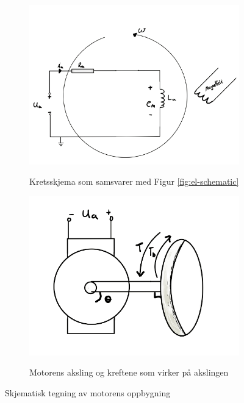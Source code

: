 \begin{figure}[h]
	\centering
	\begin{subfigure}[a]{0.450\textwidth}
		\centering
		\includegraphics[width = \textwidth]{Images/a_Circuit.png}
		\caption{}{Kretsskjema som samsvarer med Figur \ref{fig:el-schematic}}
		
	\end{subfigure}
	\begin{subfigure}[a]{0.450\textwidth}
		\centering
		\includegraphics[width = \textwidth]{Images/a_Motor.png}
		\caption{}{Motorens aksling og kreftene som virker på akslingen}
		\label{fig:el-drawing-hand}
	\end{subfigure}
	\caption{Skjematisk tegning av motorens oppbygning}
	\label{fig:schematics}
\end{figure}

